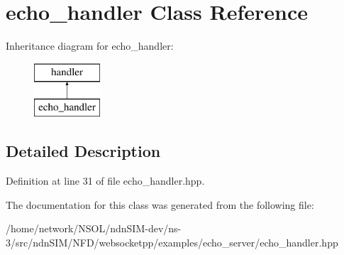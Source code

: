 \hypertarget{classecho__handler}{}\section{echo\+\_\+handler Class Reference}
\label{classecho__handler}
Inheritance diagram for echo\+\_\+handler\+:\begin{figure}[H]
\begin{center}
\leavevmode
\includegraphics[height=2.000000cm]{classecho__handler}
\end{center}
\end{figure}


\subsection{Detailed Description}


Definition at line 31 of file echo\+\_\+handler.\+hpp.



The documentation for this class was generated from the following file\+:\begin{DoxyCompactItemize}
\item 
/home/network/\+N\+S\+O\+L/ndn\+S\+I\+M-\/dev/ns-\/3/src/ndn\+S\+I\+M/\+N\+F\+D/websocketpp/examples/echo\+\_\+server/echo\+\_\+handler.\+hpp\end{DoxyCompactItemize}

